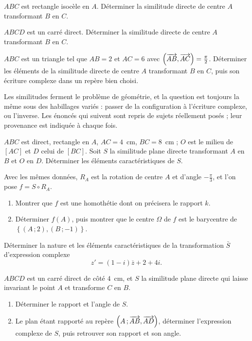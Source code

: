 \begin{entrainement}[configurations]
\exo[\niveau{2}] $ABC$ est rectangle isocèle en $A$. Déterminer la similitude
directe de centre $A$ transformant $B$ en $C$.

\exo[\niveau{2}] $ABCD$ est un carré direct. Déterminer la similitude directe
de centre $A$ transformant $B$ en $C$.

\exo[\niveau{3}] $ABC$ est un triangle tel que $AB = 2$ et $AC = 6$ avec
$\left(\overrightarrow{AB},\overrightarrow{AC}\right) = \frac{\pi}{2}$. Déterminer les éléments de
la similitude directe de centre $A$ transformant $B$ en $C$, puis son écriture
complexe dans un repère bien choisi.
\end{entrainement}

\begin{annales}
Les similitudes ferment le problème de géométrie, et la question est toujours
la même sous des habillages variés : passer de la configuration à l'écriture
complexe, ou l'inverse. Les énoncés qui suivent sont repris de sujets
réellement posés ; leur provenance est indiquée à chaque fois.

$ABC$ est direct, rectangle en $A$, $AC = 4$~cm, $BC = 8$~cm ; $O$ est le
milieu de $[AC]$ et $D$ celui de $[BC]$. Soit $S$ la similitude plane directe
transformant $A$ en $B$ et $O$ en $D$. Déterminer les éléments
caractéristiques de $S$.

Avec les mêmes données, $R_{A}$ est la rotation de centre $A$ et d'angle
$-\frac{\pi}{3}$, et l'on pose $f = S \circ R_{A}$.
\begin{enumerate}[label=\textbf{\alph*)}, leftmargin=*, itemsep=0.15em]
  \item Montrer que $f$ est une homothétie dont on précisera le rapport $k$.
  \item Déterminer $f(A)$, puis montrer que le centre $\Omega$ de $f$ est le
        barycentre de $\left\{(A\,;2),(B\,;-1)\right\}$.
\end{enumerate}

Déterminer la nature et les éléments caractéristiques de la transformation
$\bar S$ d'expression complexe
\[
  z' = (1-i)\overline z+2+4i .
\]

$ABCD$ est un carré direct de côté $4$~cm, et $S$ la similitude plane directe
qui laisse invariant le point $A$ et transforme $C$ en $B$.
\begin{enumerate}[label=\textbf{\alph*)}, leftmargin=*, itemsep=0.15em]
  \item Déterminer le rapport et l'angle de $S$.
  \item Le plan étant rapporté au repère
        $\left(A\,;\overrightarrow{AB},\overrightarrow{AD}\right)$, déterminer l'expression
        complexe de $S$, puis retrouver son rapport et son angle.
\end{enumerate}


\end{annales}
